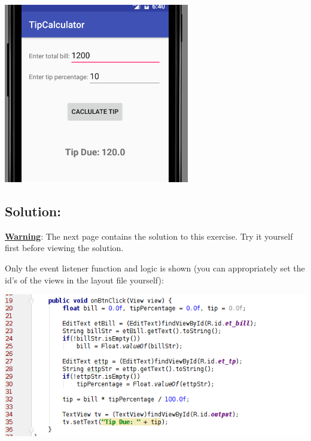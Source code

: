 \begin{center}
	\includegraphics[scale=0.4]{chapters/ch04/images/53}
\end{center}

\subsection{Solution:}
\underline{\textbf{Warning}}: The next page contains the solution to this exercise. Try it yourself first before viewing the solution.

\newpage
Only the event listener function and logic is shown (you can appropriately set the id's of the views in the layout file yourself):
\begin{center}
	\includegraphics[scale=0.4]{chapters/ch04/images/54}
\end{center}
